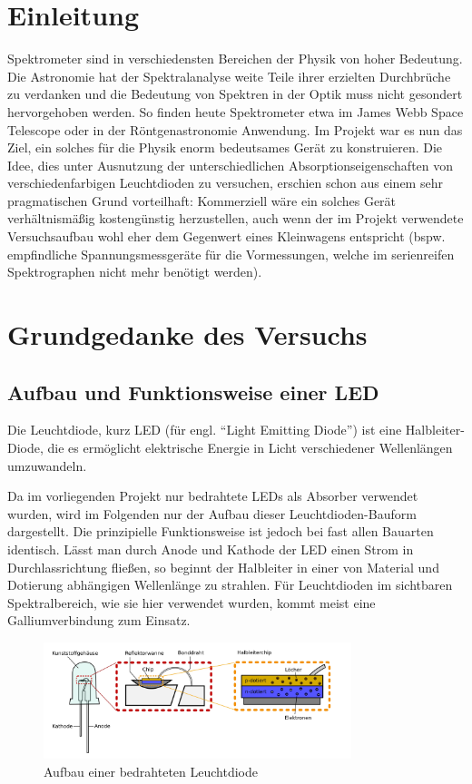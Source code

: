 \documentclass[11pt]{scrartcl}
\begin{document}
\section{Einleitung} %

Spektrometer sind in verschiedensten Bereichen der Physik von hoher Bedeutung. Die Astronomie hat der Spektralanalyse weite Teile ihrer erzielten Durchbrüche zu verdanken und die Bedeutung von Spektren in der Optik muss nicht gesondert hervorgehoben werden. So finden heute  Spektrometer etwa im James Webb Space Telescope oder in der Röntgenastronomie Anwendung. Im Projekt war es nun das Ziel, ein solches für die Physik enorm bedeutsames Gerät zu konstruieren. Die Idee, dies unter Ausnutzung der unterschiedlichen Absorptionseigenschaften von verschiedenfarbigen Leuchtdioden zu versuchen, erschien schon aus einem sehr pragmatischen Grund vorteilhaft: Kommerziell wäre ein solches Gerät verhältnismäßig kostengünstig herzustellen, auch wenn der im Projekt verwendete Versuchsaufbau wohl eher dem Gegenwert eines Kleinwagens entspricht (bspw. empfindliche Spannungsmessgeräte für die Vormessungen, welche im serienreifen Spektrographen nicht mehr benötigt werden).

\section{Grundgedanke des Versuchs}

\subsection{Aufbau und Funktionsweise einer LED}
Die Leuchtdiode, kurz LED (für engl. "`Light Emitting Diode"') ist eine Halbleiter-Diode, die es ermöglicht elektrische Energie in Licht verschiedener Wellenlängen umzuwandeln.

Da im vorliegenden Projekt nur bedrahtete LEDs als Absorber verwendet wurden, wird im Folgenden nur der Aufbau dieser Leuchtdioden-Bauform dargestellt. Die prinzipielle Funktionsweise ist jedoch bei fast allen Bauarten identisch. Lässt man durch Anode und Kathode der LED einen Strom in Durchlassrichtung fließen, so beginnt der Halbleiter in einer von Material und Dotierung abhängigen Wellenlänge zu strahlen. Für Leuchtdioden im sichtbaren Spektralbereich, wie sie hier verwendet wurden, kommt meist eine Galliumverbindung zum Einsatz.

\begin{figure}[ht]
\begin{center}
\includegraphics[width=0.8\textwidth]{ledaufbau.jpg}
\end{center}
\vspace{-1.5\baselineskip}
\caption{Aufbau einer bedrahteten Leuchtdiode}
\label{LED-Aufbau}
\end{figure}
\end{document}
